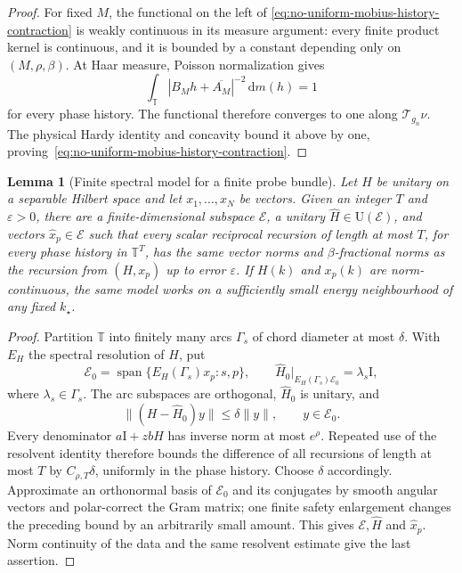 \documentclass[11pt]{article}
\newtheorem{lemma}[theorem]{Lemma}
\theoremstyle{remark}
\newcommand{\T}{\mathbb T}
\newcommand{\Id}{\mathrm I}
\newcommand{\dd}{\,\mathrm d}
\newcommand{\U}{\mathrm U}
\begin{document}
\begin{proof}
For fixed $M$, the functional on the left of
\eqref{eq:no-uniform-mobius-history-contraction} is weakly continuous in
its measure argument: every finite product kernel is continuous, and it is
bounded by a constant depending only on $(M,\rho,\beta)$.  At Haar measure,
Poisson normalization gives
\[
 \int_\T|B_Mh+\overline{A_M}|^{-2}\dd m(h)=1
\]
for every phase history.  The functional therefore converges to one along
$\mathcal T_{g_n}\nu$.  The physical Hardy identity and concavity bound it
above by one, proving~\eqref{eq:no-uniform-mobius-history-contraction}.
\end{proof}

\begin{lemma}[Finite spectral model for a finite probe bundle]
\label{lem:finite-spectral-model}
Let $H$ be unitary on a separable Hilbert space and let
$x_1,\ldots,x_N$ be vectors.  Given an integer $T$ and $\varepsilon>0$, there
are a finite-dimensional subspace $\mathcal E$, a unitary
$\widehat H\in\U(\mathcal E)$, and vectors $\widehat x_p\in\mathcal E$ such
that every scalar reciprocal recursion of length at most $T$, for every phase
history in $\T^T$, has the same vector norms and $\beta$-fractional norms as
the recursion from $(H,x_p)$ up to error $\varepsilon$.  If $H(k)$ and
$x_p(k)$ are norm-continuous, the same model works on a sufficiently small
energy neighbourhood of any fixed $k_\star$.
\end{lemma}

\begin{proof}
Partition $\T$ into finitely many arcs $\Gamma_s$ of chord diameter at most
$\delta$.  With $E_H$ the spectral resolution of $H$, put
\[
 \mathcal E_0=\operatorname{span}
 \{E_H(\Gamma_s)x_p:s,p\},
 \qquad
 \widehat H_0|_{E_H(\Gamma_s)\mathcal E_0}=\lambda_s\Id,
\]
where $\lambda_s\in\Gamma_s$.  The arc subspaces are orthogonal,
$\widehat H_0$ is unitary, and
\begin{equation}
 \|(H-\widehat H_0)y\|\leq\delta\|y\|,
 \qquad y\in\mathcal E_0.
 \label{eq:finite-spectral-residual}
\end{equation}
Every denominator $a\Id+zbH$ has inverse norm at most $e^\rho$.
Repeated use of the resolvent identity therefore bounds the difference of all
recursions of length at most $T$ by $C_{\rho,T}\delta$, uniformly in the phase
history.  Choose $\delta$ accordingly.  Approximate an orthonormal basis of
$\mathcal E_0$ and its conjugates by smooth angular vectors and polar-correct
the Gram matrix; one finite safety enlargement changes the preceding bound by
an arbitrarily small amount.  This gives $\mathcal E,\widehat H$ and
$\widehat x_p$.  Norm continuity of the data and the same resolvent estimate
give the last assertion.
\end{proof}
\end{document}

